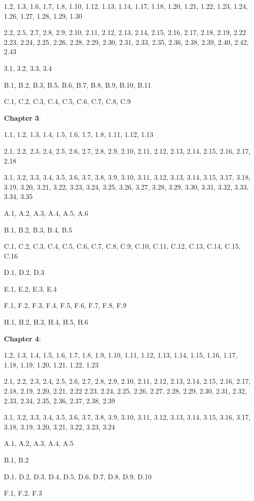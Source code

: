 \documentclass{article}
\begin{document}
1.2, 1.3, 1.6, 1.7, 1.8, 1.10, 1.12, 1.13, 1.14, 1.17, 1.18, 1.20, 1.21, 1.22, 1.23, 1.24, 1.26, 1.27, 1.28, 1.29, 1.30

2.2, 2.5, 2.7, 2.8, 2.9, 2.10, 2.11, 2.12, 2.13, 2.14, 2.15, 2.16, 2.17, 2.18, 2.19, 2.22 2.23, 2.24, 2.25, 2.26, 2.28, 2.29, 2.30, 2.31, 2.33, 2.35, 2.36, 2.38, 2.39, 2.40, 2.42, 2.43

3.1, 3.2, 3.3, 3.4

B.1, B.2, B.3, B.5, B.6, B.7, B.8, B.9, B.10, B.11

C.1, C.2, C.3, C.4, C.5, C.6, C.7, C.8, C.9
\medskip

\textbf{Chapter 3}:
\medskip

1.1, 1.2, 1.3, 1.4, 1.5, 1.6, 1.7, 1.8, 1.11, 1.12, 1.13

2.1, 2.2, 2.3, 2.4, 2.5, 2.6, 2.7, 2.8, 2.9, 2.10, 2.11, 2.12, 2.13, 2.14, 2.15, 2.16, 2.17, 2.18

3.1, 3.2, 3.3, 3.4, 3.5, 3.6, 3.7, 3.8, 3.9, 3.10, 3.11, 3.12, 3.13, 3.14, 3.15, 3.17, 3.18, 3.19, 3.20, 3.21, 3.22, 3.23, 3.24, 3.25, 3.26, 3.27, 3.28, 3.29, 3.30, 3.31, 3.32, 3.33, 3.34, 3.35

A.1, A.2, A.3, A.4, A.5, A.6

B.1, B.2, B.3, B.4, B.5

C.1, C.2, C.3, C.4, C.5, C.6, C.7, C.8, C.9, C.10, C.11, C.12, C.13, C.14, C.15, C.16

D.1, D.2, D.3

E.1, E.2, E.3, E.4

F.1, F.2, F.3, F.4, F.5, F.6, F.7, F.8, F.9

H.1, H.2, H.3, H.4, H.5, H.6
\medskip

\textbf{Chapter 4}:
\medskip

1.2, 1.3, 1.4, 1.5, 1.6, 1.7, 1.8, 1.9, 1.10, 1.11, 1.12, 1.13, 1.14, 1.15, 1.16, 1.17, 1.18, 1.19, 1.20, 1.21, 1.22, 1.23

2.1, 2.2, 2.3, 2.4, 2.5, 2.6, 2.7, 2.8, 2.9, 2.10, 2.11, 2.12, 2.13, 2.14, 2.15, 2.16, 2.17, 2.18, 2.19, 2.20, 2.21, 2.22 2.23, 2.24, 2.25, 2.26, 2.27, 2.28, 2.29, 2.30, 2.31, 2.32, 2.33, 2.34, 2.35, 2.36, 2.37, 2.38, 2.39

3.1, 3.2, 3.3, 3.4, 3.5, 3.6, 3.7, 3.8, 3.9, 3.10, 3.11, 3.12, 3.13, 3.14, 3.15, 3.16, 3.17, 3.18, 3.19, 3.20, 3.21, 3.22, 3.23, 3.24

A.1, A.2, A.3, A.4, A.5

B.1, B.2

D.1, D.2, D.3, D.4, D.5, D.6, D.7, D.8, D.9, D.10

F.1, F.2, F.3
\end{document}
